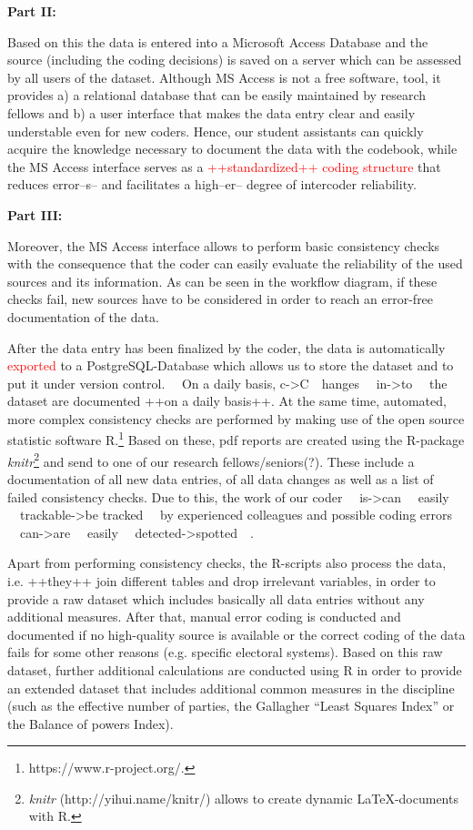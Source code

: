 \documentclass[
  11pt
]{article}
\begin{document}
\textbf{Part II:}

Based on this the data is entered into a Microsoft Access Database and the source (including the coding decisions) is saved on a server which can be assessed by all users of the dataset. Although MS Access is not a free software, tool, it provides a) a relational database that can be easily maintained by research fellows and b) a user interface that makes the data entry clear and easily understable even for new coders. Hence, our student assistants can quickly acquire the knowledge necessary to document the data with the codebook, while the MS Access interface serves as a \textcolor{red}{{++standardized++} coding structure} that reduces error{--s--} and facilitates a high{--er--} degree of intercoder reliability.

\textbf{Part III:}

Moreover, the MS Access interface allows to perform basic consistency checks with the consequence that the coder can easily evaluate the reliability of the used sources and its information. As can be seen in the workflow diagram, if these checks fail, new sources have to be considered in order to reach an error-free documentation of the data.

After the data entry has been finalized by the coder, the data is automatically \textcolor{red}{exported} to a PostgreSQL-Database which allows us to store the dataset and to put it under version control. {~~On a daily basis, c->C~~}hanges {~~in->to~~} the dataset are documented {++on a daily basis++}. At the same time, automated, more complex consistency checks are performed by making use of the open source statistic software R.\footnote{https://www.r-project.org/.} Based on these, pdf reports are created using the R-package \textit{knitr}\footnote{\textit{knitr} (http://yihui.name/knitr/) allows to create dynamic \LaTeX-documents with R.} and send to one of our research fellows/seniors(?). These include a documentation of all new data entries, of all data changes as well as a list of failed consistency checks. Due to this, the work of our coder {~~is->can~~} easily {~~trackable->be tracked~~} by experienced colleagues and possible coding errors {~~can->are~~} easily {~~detected->spotted~~}.

Apart from performing consistency checks, the R-scripts also process the data, i.e. {++they++} join different tables and drop irrelevant variables, in order to provide a raw dataset which includes basically all data entries without any additional measures. After that, manual error coding is conducted and documented if no high-quality source is available or the correct coding of the data fails for some other reasons (e.g. specific electoral systems). Based on this raw dataset, further additional calculations are conducted using R in order to provide an extended dataset that includes additional common measures in the discipline (such as the effective number of parties, the Gallagher “Least Squares Index” or the Balance of powers Index).
\end{document}
